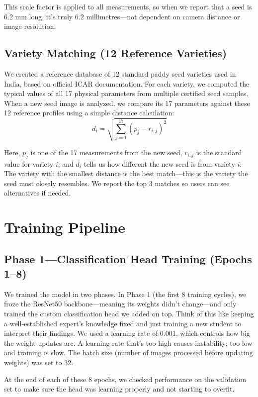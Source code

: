 This scale factor is applied to all measurements, so when we report that a seed is 6.2 mm long, it's truly 6.2 millimetres—not dependent on camera distance or image resolution.

\subsection{Variety Matching (12 Reference Varieties)}

We created a reference database of 12 standard paddy seed varieties used in India, based on official ICAR documentation. For each variety, we computed the typical values of all 17 physical parameters from multiple certified seed samples. When a new seed image is analyzed, we compare its 17 parameters against these 12 reference profiles using a simple distance calculation:
\begin{equation}
d_i = \sqrt{\sum_{j=1}^{17} (p_j - r_{i,j})^2}
\end{equation}

Here, $p_j$ is one of the 17 measurements from the new seed, $r_{i,j}$ is the standard value for variety $i$, and $d_i$ tells us how different the new seed is from variety $i$. The variety with the smallest distance is the best match—this is the variety the seed most closely resembles. We report the top 3 matches so users can see alternatives if needed.

\section{Training Pipeline}

\subsection{Phase 1---Classification Head Training (Epochs 1--8)}

We trained the model in two phases. In Phase 1 (the first 8 training cycles), we froze the ResNet50 backbone—meaning its weights didn't change—and only trained the custom classification head we added on top. Think of this like keeping a well-established expert's knowledge fixed and just training a new student to interpret their findings. We used a learning rate of 0.001, which controls how big the weight updates are. A learning rate that's too high causes instability; too low and training is slow. The batch size (number of images processed before updating weights) was set to 32.

At the end of each of these 8 epochs, we checked performance on the validation set to make sure the head was learning properly and not starting to overfit.


